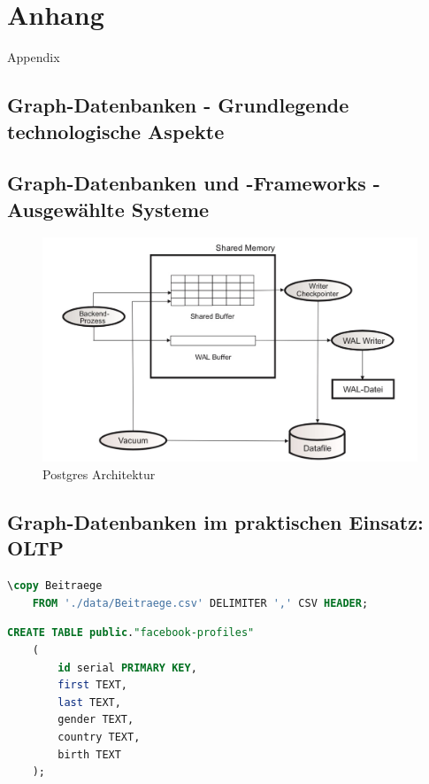 \appendix
\chapter{Anhang}
Appendix
\section{Graph-Datenbanken - Grundlegende technologische Aspekte}
\section{Graph-Datenbanken und -Frameworks - Ausgewählte Systeme}
\begin{figure}[H]

    \includegraphics[width = \linewidth]{images/postgresArchitektur.jpg}
    \caption{Postgres Architektur}
    \label{Postgres Architektur}

\end{figure}
\section{Graph-Datenbanken im praktischen Einsatz: OLTP}
\begin{lstlisting}[language=SQL,caption=CSV Input,frame=single]
    \copy Beitraege
    FROM './data/Beitraege.csv' DELIMITER ',' CSV HEADER;
\end{lstlisting}

\begin{lstlisting}[language=SQL,caption=Anlegen der Tabelle facebook-profiles,frame=single]
    CREATE TABLE public."facebook-profiles"
    (
        id serial PRIMARY KEY,
        first TEXT,
        last TEXT,
        gender TEXT,
        country TEXT,
        birth TEXT
    );
\end{lstlisting}

